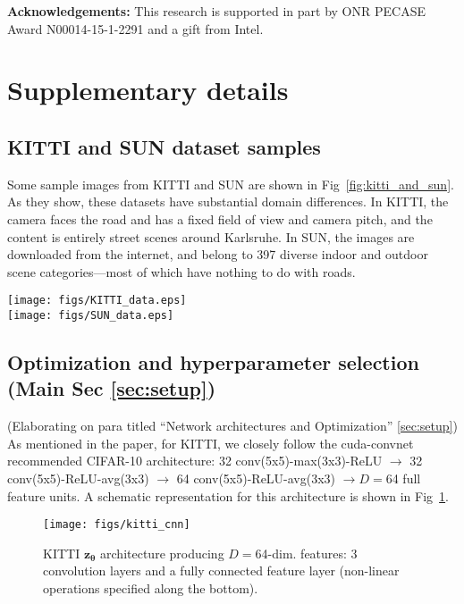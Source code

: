 \documentclass[10pt,twocolumn,letterpaper]{article}
\begin{document}
\vspace{0.05in}\noindent\small{\textbf{Acknowledgements:} This research is supported in part by ONR PECASE Award N00014-15-1-2291 and a gift from Intel.}
\newpage
\small{


}
\newpage
\section{Supplementary details}\subsection{KITTI and SUN dataset samples}
Some sample images from KITTI and SUN are shown in Fig~\ref{fig:kitti_and_sun}. As they show, these datasets have substantial domain differences. In KITTI, the camera faces the road and has a fixed field of view and camera pitch, and the content is entirely street scenes around Karlsruhe.  In SUN, the images are downloaded from the internet, and belong to 397 diverse indoor and outdoor scene categories---most of which have nothing to do with roads.
\begin{figure*}[t]
 \centering
  \texttt{[image: figs/KITTI\_data.eps]}
  \\
  \texttt{[image: figs/SUN\_data.eps]}
  \caption{(top) Figure from~\cite{kitti} showcasing images from the 4 KITTI location classes (shown here in color; we use grayscale images), and (bottom) Figure from~\cite{sun} showcasing images from a subset of the 397 SUN classes (shown here in color; see text in main paper for image pre-processing details).}
  \label{fig:kitti_and_sun}
\end{figure*}\subsection{Optimization and hyperparameter selection (Main Sec \ref{sec:setup})}
(Elaborating on para titled ``Network architectures and Optimization'' \ref{sec:setup})
As mentioned in the paper, for KITTI, we closely follow the cuda-convnet~\cite{cuda-convnet} recommended CIFAR-10 architecture: 32 conv(5x5)-max(3x3)-ReLU $\rightarrow$ 32 conv(5x5)-ReLU-avg(3x3) $\rightarrow$ 64 conv(5x5)-ReLU-avg(3x3) $\rightarrow$$D=$64 full feature units. A schematic representation for this architecture is shown in Fig~\ref{fig:kitti_net}.

\begin{figure}
  \centering
  \texttt{[image: figs/kitti\_cnn]}
  \caption{{KITTI $\mathbf{z_{\bm{\theta}}}$ architecture producing $D=$64-dim. features: 3 convolution layers and a fully connected feature layer (non-linear operations specified along the bottom).}}
  \vspace{-0.1in}
  \label{fig:kitti_net}
\end{figure}
\end{document}
